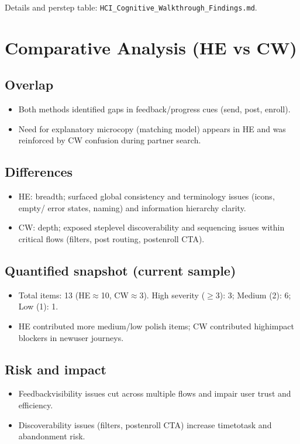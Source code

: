 \documentclass[11pt,a4paper]{article}
\begin{document}
Details and per\-step table: \texttt{HCI\_Cognitive\_Walkthrough\_Findings.md}.

\section{Comparative Analysis (HE vs CW)}

\subsection{Overlap}
\begin{itemize}[leftmargin=*]
  \item Both methods identified gaps in feedback/progress cues (send, post, enroll).
  \item Need for explanatory micro\-copy (matching model) appears in HE and was reinforced by CW confusion during partner search.
\end{itemize}

\subsection{Differences}
\begin{itemize}[leftmargin=*]
  \item HE: breadth; surfaced global consistency and terminology issues (icons, empty/ error states, naming) and information hierarchy clarity.
  \item CW: depth; exposed step\-level discoverability and sequencing issues within critical flows (filters, post routing, post\-enroll CTA).
\end{itemize}

\subsection{Quantified snapshot (current sample)}
\begin{itemize}[leftmargin=*]
  \item Total items: 13 (HE$\approx$10, CW$\approx$3). High severity ($\geq$3): 3; Medium (2): 6; Low (1): 1.
  \item HE contributed more medium/low polish items; CW contributed high\-impact blockers in new\-user journeys.
\end{itemize}

\subsection{Risk and impact}
\begin{itemize}[leftmargin=*]
  \item Feedback\-visibility issues cut across multiple flows and impair user trust and efficiency.
  \item Discoverability issues (filters, post\-enroll CTA) increase time\-to\-task and abandonment risk.
\end{itemize}
\end{document}

